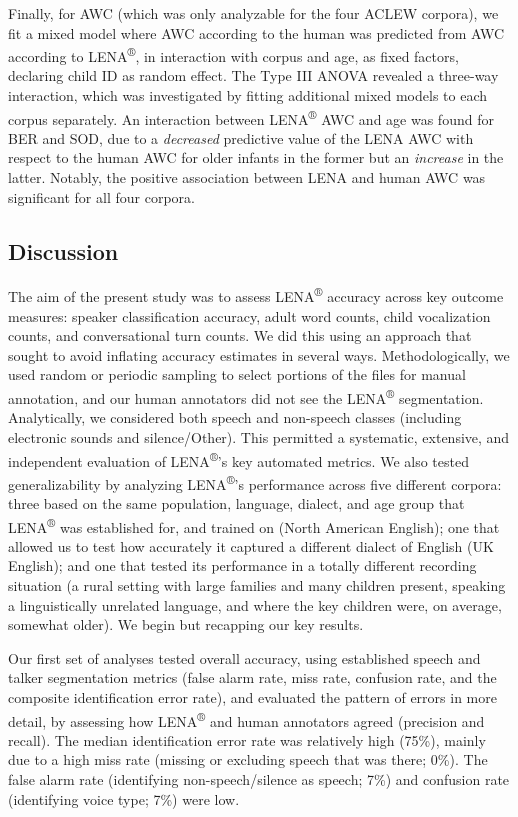 \documentclass[english,table,man,floatsintext]{apa6}
\begin{document}
Finally, for AWC (which was only analyzable for the four ACLEW corpora), we fit a mixed model where AWC according to the human was predicted from AWC according to LENA\textsuperscript{®}, in interaction with corpus and age, as fixed factors, declaring child ID as random effect. The Type III ANOVA revealed a three-way interaction, which was investigated by fitting additional mixed models to each corpus separately. An interaction between LENA\textsuperscript{®} AWC and age was found for BER and SOD, due to a \emph{decreased} predictive value of the LENA AWC with respect to the human AWC for older infants in the former but an \emph{increase} in the latter. Notably, the positive association between LENA and human AWC was significant for all four corpora.

\hypertarget{discussion}{%
\subsection{Discussion}\label{discussion}}

The aim of the present study was to assess LENA\textsuperscript{®} accuracy across key outcome measures: speaker classification accuracy, adult word counts, child vocalization counts, and conversational turn counts. We did this using an approach that sought to avoid inflating accuracy estimates in several ways. Methodologically, we used random or periodic sampling to select portions of the files for manual annotation, and our human annotators did not see the LENA\textsuperscript{®} segmentation. Analytically, we considered both speech and non-speech classes (including electronic sounds and silence/Other). This permitted a systematic, extensive, and independent evaluation of LENA\textsuperscript{®}'s key automated metrics. We also tested generalizability by analyzing LENA\textsuperscript{®}'s performance across five different corpora: three based on the same population, language, dialect, and age group that LENA\textsuperscript{®} was established for, and trained on (North American English); one that allowed us to test how accurately it captured a different dialect of English (UK English); and one that tested its performance in a totally different recording situation (a rural setting with large families and many children present, speaking a linguistically unrelated language, and where the key children were, on average, somewhat older). We begin but recapping our key results.

Our first set of analyses tested overall accuracy, using established speech and talker segmentation metrics (false alarm rate, miss rate, confusion rate, and the composite identification error rate), and evaluated the pattern of errors in more detail, by assessing how LENA\textsuperscript{®} and human annotators agreed (precision and recall). The median identification error rate was relatively high (75\%), mainly due to a high miss rate (missing or excluding speech that was there; 0\%). The false alarm rate (identifying non-speech/silence as speech; 7\%) and confusion rate (identifying voice type; 7\%) were low.
\end{document}
